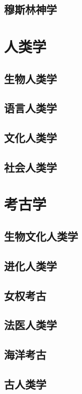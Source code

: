 \documentclass[UTF8]{RepresentationUniverse}
\begin{document}
\section{穆斯林神学}


\chapter{人类学}
\section{生物人类学}
\section{语言人类学}
\section{文化人类学}
\section{社会人类学}

\chapter{考古学}
\section{生物文化人类学}
\section{进化人类学}
\section{女权考古}
\section{法医人类学}
\section{海洋考古}
\section{古人类学}
\end{document}
